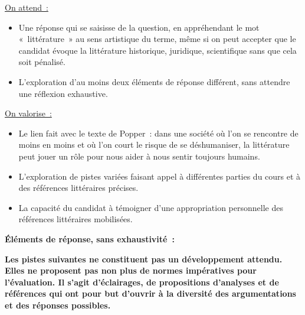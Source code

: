 {\underline{On attend~:}
\begin{itemize}
\item Une réponse qui se saisisse de la question, en appréhendant le mot «~littérature~» au
sens artistique du terme, même si on peut accepter que le candidat évoque la littérature
historique, juridique, scientifique sans que cela soit pénalisé.
\item L'exploration d'au moins deux éléments de réponse différent, sans attendre une
réflexion exhaustive.
\end{itemize}

\underline{On valorise~:}
\begin{itemize}
\item Le lien fait avec le texte de Popper~: dans une société où l'on se rencontre de moins
en moins et où l'on court le risque de se déshumaniser, la littérature peut jouer un rôle
pour nous aider à nous sentir toujours humains.
\item L'exploration de pistes variées faisant appel à différentes parties du cours et à des
références littéraires précises.
\item La capacité du candidat à témoigner d'une appropriation personnelle des références
littéraires mobilisées.
\end{itemize}

\textbf{Éléments de réponse, sans exhaustivité~:}

\textbf{Les pistes suivantes ne constituent pas un développement attendu. Elles ne proposent pas
non plus de normes impératives pour l'évaluation. Il s'agit d'éclairages, de propositions
d'analyses et de références qui ont pour but d'ouvrir à la diversité des argumentations et des
réponses possibles.}

}
